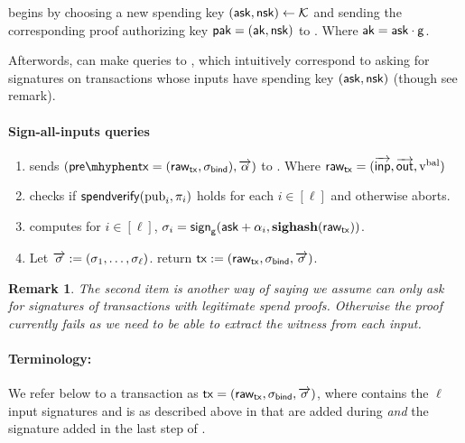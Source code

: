 \documentclass[11pt]{article}
\numberwithin{equation}{section} %
\numberwithin{figure}{section} %
\newtheorem{remark}[thm]{Remark}
\newcommand{\inps}{\ensuremath{\overrightarrow{\mathsf{inp}}}\xspace}
\newcommand{\outs}{\ensuremath{\overrightarrow{\mathsf{out}}}\xspace}
\begin{document}
\oracle begins by choosing a new spending key $(\mathsf{ask},\mathsf{nsk})\leftarrow {\mathcal K}$ and sending the corresponding proof authorizing key
$\mathsf{pak}=(\mathsf{ak},\mathsf{nsk})$ to \adv.  Where $\mathsf{ak}=\mathsf{ask}\cdot \mathsf{g}$.


Afterwords, 
\adv can make \signallinputs queries to \oracle,
which intuitively correspond to asking for signatures on transactions whose inputs have spending key $(\mathsf{ask},\mathsf{nsk})$ (though see remark). 
\paragraph{Sign-all-inputs queries}%
\begin{enumerate}
 \item \adv sends $(\pretx=(\rawtx,\sigval),\alphas)$ to \oracle.
 Where $\rawtx = (\inps,\outs,\vbal)$
 \item \oracle checks if $\mathsf{spendverify}(\mathrm{pub}_i,\pi_i)$ holds for each $i\in [\ell]$ and otherwise aborts.
 \item  \oracle computes for $i\in [\ell]$, $\sigma_i = \mathsf{sign}_{\mathsf{g}}(\mathsf{ask}+\alpha_i,\mathbf{sighash}(\mathsf{raw_{tx}}))$.
 \item Let $\overrightarrow{\mathsf{\sigma}}:= (\sigma_1,\ldots,\sigma_\ell)$. \oracle return $\mathsf{tx}:=(\mathsf{raw_{tx}},\sigma_{\mathsf{bind}},\overrightarrow{\mathsf{\sigma}})$. 
\end{enumerate}
\begin{remark}
 The second item is another way of saying we assume \adv can only ask \oracle for signatures of transactions with legitimate spend proofs.
 Otherwise the proof currently fails as we need to be able to extract the witness from each input.
\end{remark}

%  


\paragraph{Terminology:}
We refer below to a transaction \tx as $\mathsf{tx}=(\mathsf{raw_{tx}},\sigma_{\mathsf{bind}},\overrightarrow{\mathsf{\sigma}})$, where \sigs contains the $\ell$ input signatures and \sigval is as described above in 
\maketx{} 
that are added during \signallinputs \emph{and} the signature \sigval added in the last step of \maketx.
\end{document}
